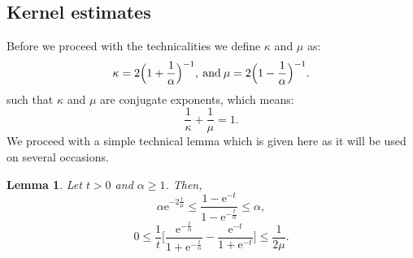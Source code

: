 \documentclass[a4paper,oneside,10pt]{amsproc}
\newtheorem{lemma}{Lemma}
\theoremstyle{remark}
\renewcommand{\leq}{\leqslant}
\renewcommand{\leq}{\leqslant}
\renewcommand{\geq}{\geqslant}
\newcommand{\e}{\mathrm{e}} %
\renewcommand{\leq}{\leqslant}%
\renewcommand{\geq}{\geqslant}%
\begin{document}
\subsection{Kernel estimates}
Before we proceed with the technicalities we define $\kappa$ and
$\mu$ as:
\begin{equation*}
  \kappa = 2\Bigl(1 + \frac1\alpha \Bigr)^{-1}, \: \text{and} \: \mu
  = 2\Bigl(1 - \frac1\alpha \Bigr)^{-1}.
\end{equation*}
such that $\kappa$ and $\mu$ are conjugate exponents, which means:
\begin{equation*}
  \frac1{\kappa} + \frac1{\mu} = 1.
\end{equation*}
We proceed with a simple technical lemma which is given here as it
will be used on several occasions.
\begin{lemma}\label{lem:Time-part-Mehler-time-transform}
  Let $t > 0$ and $\alpha \geq 1$. Then,
  \begin{equation}
    \label{eq:Time-part-Mehler-time-transform-1}
    \alpha \e^{-2\frac{t}{\mu}} \leq \frac{1 -
      \e^{-t}}{1 - \e^{-\frac{t}{\alpha}}} \leq \alpha,
  \end{equation}
  \begin{equation}
    \label{eq:Time-part-Mehler-time-transform-2}
    0 \leq \frac1t \biggl[\frac{\e^{-\frac{t}\alpha}}{1 + \e^{-\frac{t}{\alpha}}}
    - \frac{\e^{-t}}{1 + \e^{-t}} \biggr] \leq \frac{1}{2 \mu}.
  \end{equation}
\end{lemma}
\end{document}
